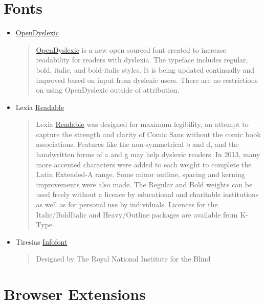\documentclass[letterpaper,10pt,english]{sphinxmanual}
\begin{document}
\section{Fonts}
\label{resources:fonts}\begin{itemize}
\item {} 
\href{http://opendyslexic.org/}{OpenDyslexic}
\begin{quote}

\href{http://opendyslexic.org/}{OpenDyslexic} is a new open sourced font created to increase readability for readers with dyslexia. The typeface includes regular, bold, italic, and bold-italic styles. It is being updated continually and improved based on input from dyslexic users. There are no restrictions on using OpenDyslexic outside of attribution.
\end{quote}

\item {} 
Lexia \href{http://www.k-type.com/?p=520}{Readable}
\begin{quote}

Lexia \href{http://www.k-type.com/?p=520}{Readable} was designed for maximum legibility, an attempt to capture the strength and clarity of Comic Sans without the comic book associations. Features like the non-symmetrical b and d, and the handwritten forms of a and g may help dyslexic readers.
In 2013, many more accented characters were added to each weight to complete the Latin Extended-A range. Some minor outline, spacing and kerning improvements were also made.
The Regular and Bold weights can be used freely without a licence by educational and charitable institutions as well as for personal use by individuals.
Licences for the Italic/BoldItalic and Heavy/Outline packages are available from K-Type.
\end{quote}

\item {} 
Tiresias \href{http://www.fontsquirrel.com/fonts/Tiresias-Infofont}{Infofont}
\begin{quote}

Designed by The Royal National Institute for the Blind
\end{quote}

\end{itemize}


\section{Browser Extensions}
\label{resources:browser-extensions}
\end{document}
